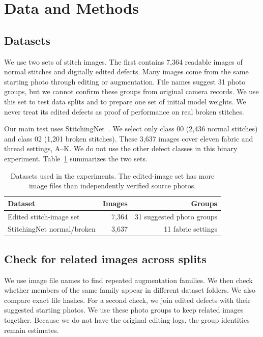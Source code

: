 \documentclass[conference,a4paper]{IEEEtran}
\begin{document}
\section{Data and Methods}
\subsection{Datasets}
We use two sets of stitch images. The first contains 7,364 readable images of normal stitches and digitally edited defects. Many images come from the same starting photo through editing or augmentation. File names suggest 31 photo groups, but we cannot confirm these groups from original camera records. We use this set to test data splits and to prepare one set of initial model weights. We never treat its edited defects as proof of performance on real broken stitches.

Our main test uses StitchingNet~\cite{jung2025}. We select only class 00 (2,436 normal stitches) and class 02 (1,201 broken stitches). These 3,637 images cover eleven fabric and thread settings, A--K. We do not use the other defect classes in this binary experiment. Table~\ref{tab:data} summarizes the two sets.

\begin{table}[!t]\centering
\caption{Datasets used in the experiments. The edited-image set has more image files than independently verified source photos.}\label{tab:data}
\footnotesize\setlength{\tabcolsep}{3pt}
\begin{tabular}{p{}rr}\toprule
Dataset & Images & Groups\\\midrule
Edited stitch-image set & 7,364 & 31 suggested photo groups\\
StitchingNet normal/broken & 3,637 & 11 fabric settings\\\bottomrule
\end{tabular}
\end{table}

\subsection{Check for related images across splits}
We use image file names to find repeated augmentation families. We then check whether members of the same family appear in different dataset folders. We also compare exact file hashes. For a second check, we join edited defects with their suggested starting photos. We use these photo groups to keep related images together. Because we do not have the original editing logs, the group identities remain estimates.
\end{document}
